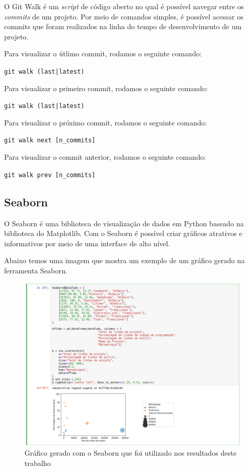 O Git Walk é um \emph{script} de código aberto no qual é possível navegar entre os \emph{commits} de um projeto. Por meio de comandos simples, é possível acessar os commits que foram realizados na linha do tempo de desenvolvimento de um projeto.  

Para visualizar o útlimo commit, rodamos o seguinte comando:

\texttt{git walk (last|latest)}

Para visualizar o primeiro commit, rodamos o seguinte comando:

\texttt{git walk (last|latest)}

Para visualizar o próximo commit, rodamos o seguinte comando:

\texttt{git walk next [n\_commits]}

Para visualizar o commit anterior, rodamos o seguinte comando:

\texttt{git walk prev [n\_commits]}

\hypertarget{seaborn}{%
\subsection{Seaborn}\label{seaborn}}

O Seaborn é uma biblioteca de visualização de dados em Python baseado na biblioteca do Matplotlib. Com o Seaborn é possível criar gráficos atrativos e informativos por meio de uma interface de alto nível.

Abaixo temos uma imagem que mostra um exemplo de um gráfico gerado na ferramenta Seaborn.

\begin{figure}[H]
\centering
\includegraphics{figuras/seaborn.png}
\caption{Gráfico gerado com o Seaborn que foi utilizado nos resultados deste trabalho}
\end{figure}

